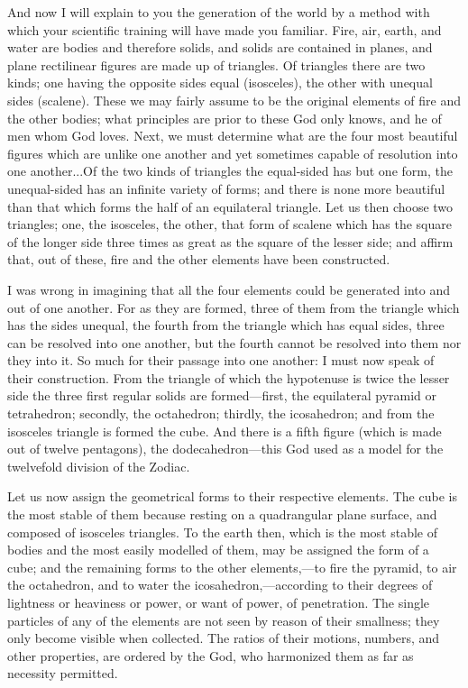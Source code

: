 And now I will explain to you the generation of the world by a method with
which your scientific training will have made you familiar. Fire, air,
earth, and water are bodies and therefore solids, and solids are contained
in planes, and plane rectilinear figures are made up of triangles. Of
triangles there are two kinds; one having the opposite sides equal
(isosceles), the other with unequal sides (scalene). These we may fairly
assume to be the original elements of fire and the other bodies; what
principles are prior to these God only knows, and he of men whom God
loves. Next, we must determine what are the four most beautiful figures
which are unlike one another and yet sometimes capable of resolution into
one another...Of the two kinds of triangles the equal-sided has but one
form, the unequal-sided has an infinite variety of forms; and there is
none more beautiful than that which forms the half of an equilateral
triangle. Let us then choose two triangles; one, the isosceles, the other,
that form of scalene which has the square of the longer side three times
as great as the square of the lesser side; and affirm that, out of these,
fire and the other elements have been constructed.

I was wrong in imagining that all the four elements could be generated
into and out of one another. For as they are formed, three of them from
the triangle which has the sides unequal, the fourth from the triangle
which has equal sides, three can be resolved into one another, but the
fourth cannot be resolved into them nor they into it. So much for their
passage into one another: I must now speak of their construction. From the
triangle of which the hypotenuse is twice the lesser side the three first
regular solids are formed—first, the equilateral pyramid or
tetrahedron; secondly, the octahedron; thirdly, the icosahedron; and from
the isosceles triangle is formed the cube. And there is a fifth figure
(which is made out of twelve pentagons), the dodecahedron—this God
used as a model for the twelvefold division of the Zodiac.

Let us now assign the geometrical forms to their respective elements. The
cube is the most stable of them because resting on a quadrangular plane
surface, and composed of isosceles triangles. To the earth then, which is
the most stable of bodies and the most easily modelled of them, may be
assigned the form of a cube; and the remaining forms to the other
elements,—to fire the pyramid, to air the octahedron, and to water
the icosahedron,—according to their degrees of lightness or
heaviness or power, or want of power, of penetration. The single particles
of any of the elements are not seen by reason of their smallness; they
only become visible when collected. The ratios of their motions, numbers,
and other properties, are ordered by the God, who harmonized them as far
as necessity permitted.

